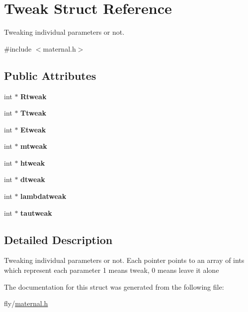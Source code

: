 \hypertarget{structTweak}{
\section{Tweak Struct Reference}
\label{structTweak}
}


Tweaking individual parameters or not.  


{\ttfamily \#include $<$maternal.h$>$}\subsection*{Public Attributes}
\begin{DoxyCompactItemize}
\item 
\hypertarget{structTweak_a26281c243a6ab8c9375a77841aea2301}{
int $\ast$ {\bfseries Rtweak}}
\label{structTweak_a26281c243a6ab8c9375a77841aea2301}

\item 
\hypertarget{structTweak_adb7525d3019a8f3f42bbecc1bd825899}{
int $\ast$ {\bfseries Ttweak}}
\label{structTweak_adb7525d3019a8f3f42bbecc1bd825899}

\item 
\hypertarget{structTweak_a2a81c81d654b4a72b840962cdbce9cae}{
int $\ast$ {\bfseries Etweak}}
\label{structTweak_a2a81c81d654b4a72b840962cdbce9cae}

\item 
\hypertarget{structTweak_a080e007808d8fc7854e557a74dc79b2d}{
int $\ast$ {\bfseries mtweak}}
\label{structTweak_a080e007808d8fc7854e557a74dc79b2d}

\item 
\hypertarget{structTweak_a6eca3dc37e8628a0f6d28815aab95940}{
int $\ast$ {\bfseries htweak}}
\label{structTweak_a6eca3dc37e8628a0f6d28815aab95940}

\item 
\hypertarget{structTweak_ad5269b2dbd34ca461e3c2008635a9b97}{
int $\ast$ {\bfseries dtweak}}
\label{structTweak_ad5269b2dbd34ca461e3c2008635a9b97}

\item 
\hypertarget{structTweak_adb545f4d2e6b30dd67b193a082ab938d}{
int $\ast$ {\bfseries lambdatweak}}
\label{structTweak_adb545f4d2e6b30dd67b193a082ab938d}

\item 
\hypertarget{structTweak_a9731bcff455d70ce2224042aeb8934bc}{
int $\ast$ {\bfseries tautweak}}
\label{structTweak_a9731bcff455d70ce2224042aeb8934bc}

\end{DoxyCompactItemize}


\subsection{Detailed Description}
Tweaking individual parameters or not. Each pointer points to an array of ints which represent each parameter 1 means tweak, 0 means leave it alone 

The documentation for this struct was generated from the following file:\begin{DoxyCompactItemize}
\item 
fly/\hyperlink{maternal_8h}{maternal.h}\end{DoxyCompactItemize}
